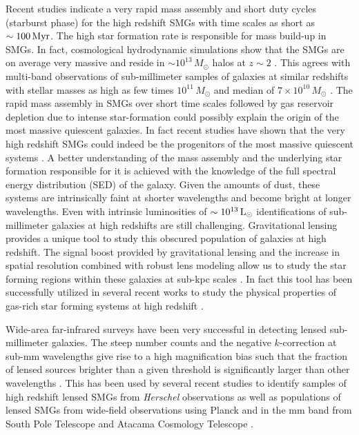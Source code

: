 \documentclass[iop,apj,useAMS,usenatbib]{emulateapj-rtx4}
\begin{document}
Recent studies indicate a very rapid mass assembly and short
duty cycles (starburst phase) for the high redshift SMGs \citep {Greve2005, Tacconi2006, Tacconi2008,
  Riechers2011, Magnelli2012, Toft2014}
with time scales as short as $\rm \sim 100\,Myr$. The high
star formation rate is responsible for mass build-up in SMGs. In
fact, cosmological hydrodynamic simulations show that the SMGs are on
average very massive and reside in $\sim 10^{13}\,M_{\odot}$
halos at $z\sim2$ \citep{Dave2010}. This agrees with multi-band observations of
sub-millimeter samples of galaxies at similar redshifts with stellar
masses as high as few times $10^{11}\,M_{\odot}$ and median of
$7\times10^{10}\,M_{\odot}$ \citet{Hainline2011}. The rapid mass assembly in SMGs
over short time scales followed by gas reservoir depletion due to
intense star-formation could possibly explain the origin
of the most massive quiescent galaxies. In fact recent studies have shown
that the very high redshift SMGs could indeed be
the progenitors of the most massive quiescent systems \citep
{Nayyeri2014, Toft2014}. A better
understanding of the mass assembly and the underlying star formation
responsible for it is achieved with the knowledge of the full
spectral energy distribution (SED) of the galaxy. Given the amounts of
dust, these systems are intrinsically
faint at shorter wavelengths and
become bright at longer wavelengths. Even with intrinsic luminosities
of $\rm \sim 10^{13}\,L_{\odot}$ identifications of sub-millimeter galaxies at high redshifts are still
challenging. Gravitational lensing provides a unique tool to study this
obscured population of galaxies at high redshift. The signal boost
provided by gravitational lensing and the increase in spatial
resolution combined with robust lens modeling 
allow us to study the star forming regions within these galaxies at
sub-kpc scales \citep {Swinbank2010, Dye2015, Swinbank2015,
  Rybak2015}. In fact this tool has been successfully utilized in several recent works to study the physical
properties of gas-rich star forming systems at high redshift \citep
{Ivison1998, Ivison2000, Frayer1998, Frayer1999,
  Riechers2011b, Gavazzi2011, Swinbank2011, Bussmann2012, Fu2012,
  Fu2013, Bussmann2013, Rawle2014, Messias2014, Timmons2015,
Bussmann2015}.

Wide-area far-infrared surveys have been very successful
in detecting lensed sub-millimeter galaxies. The steep number counts and
the negative $k$-correction at sub-mm wavelengths give rise to a
high magnification bias such that the fraction of lensed sources brighter
than a given threshold is significantly larger than other
wavelengths \citep{Blain1996}. This has been used by several recent studies
\citep {Negrello2010, Wardlow2013, Nayyeri2016, Negrello2016} to identify samples of high
redshift lensed SMGs from {\it Herschel} observations as well as
populations of lensed SMGs from wide-field observations
using Planck \citep{Canameras2015} and in the mm band from South Pole
Telescope \citep{Mocanu2013, Weiss2013, Mancuso2016, Strandet2016} and
Atacama Cosmology Telescope \citep{Su2017}.
\end{document}
